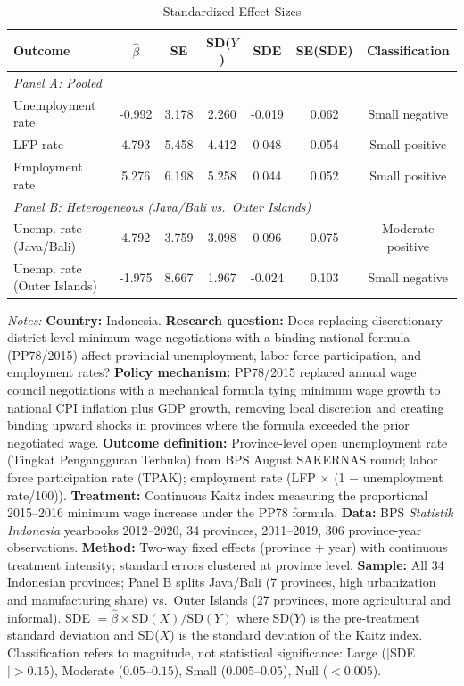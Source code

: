 \begin{table}[htbp]
\centering
\caption{Standardized Effect Sizes}
\label{tab:sde}
\begin{threeparttable}\small
\begin{tabular}{lcccccc}
\hline\hline
Outcome & $\hat{\beta}$ & SE & SD($Y$) & SDE & SE(SDE) & Classification \\
\hline
\multicolumn{7}{l}{\textit{Panel A: Pooled}} \\
Unemployment rate & -0.992 & 3.178 & 2.260 & -0.019 & 0.062 & Small negative \\
LFP rate & 4.793 & 5.458 & 4.412 & 0.048 & 0.054 & Small positive \\
Employment rate & 5.276 & 6.198 & 5.258 & 0.044 & 0.052 & Small positive \\
\hline
\multicolumn{7}{l}{\textit{Panel B: Heterogeneous (Java/Bali vs.\ Outer Islands)}} \\
Unemp. rate (Java/Bali) & 4.792 & 3.759 & 3.098 & 0.096 & 0.075 & Moderate positive \\
Unemp. rate (Outer Islands) & -1.975 & 8.667 & 1.967 & -0.024 & 0.103 & Small negative \\
\hline\hline
\end{tabular}
\begin{tablenotes}[flushleft]
\footnotesize
\item \textit{Notes:} \textbf{Country:} Indonesia. \textbf{Research question:} Does replacing discretionary district-level minimum wage negotiations with a binding national formula (PP78/2015) affect provincial unemployment, labor force participation, and employment rates? \textbf{Policy mechanism:} PP78/2015 replaced annual wage council negotiations with a mechanical formula tying minimum wage growth to national CPI inflation plus GDP growth, removing local discretion and creating binding upward shocks in provinces where the formula exceeded the prior negotiated wage. \textbf{Outcome definition:} Province-level open unemployment rate (Tingkat Pengangguran Terbuka) from BPS August SAKERNAS round; labor force participation rate (TPAK); employment rate (LFP $\times$ (1 $-$ unemployment rate/100)). \textbf{Treatment:} Continuous Kaitz index measuring the proportional 2015--2016 minimum wage increase under the PP78 formula. \textbf{Data:} BPS \textit{Statistik Indonesia} yearbooks 2012--2020, 34 provinces, 2011--2019, 306 province-year observations. \textbf{Method:} Two-way fixed effects (province + year) with continuous treatment intensity; standard errors clustered at province level. \textbf{Sample:} All 34 Indonesian provinces; Panel B splits Java/Bali (7 provinces, high urbanization and manufacturing share) vs.\ Outer Islands (27 provinces, more agricultural and informal). SDE $= \hat{\beta} \times \text{SD}(X) / \text{SD}(Y)$ where SD($Y$) is the pre-treatment standard deviation and SD($X$) is the standard deviation of the Kaitz index. Classification refers to magnitude, not statistical significance: Large ($|$SDE$| > 0.15$), Moderate ($0.05$--$0.15$), Small ($0.005$--$0.05$), Null ($< 0.005$).
\end{tablenotes}
\end{threeparttable}
\end{table}

